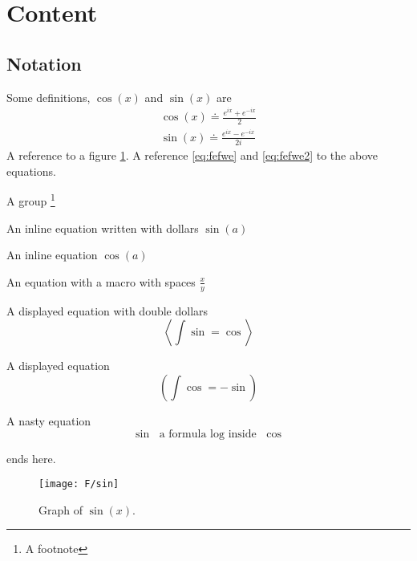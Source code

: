 \section{Content}

\subsection{Notation}

\begin{Defn}
  \label{defn:1}
  Some definitions, $\cos(x)$ and \(\sin(x)\) are
  \begin{eqnarray}
    \cos(x) \doteq \frac{e^{ix}+e^{-ix}}{2}  \label{eq:fefwe} \\
    \sin(x) \doteq \frac{e^{ix}-e^{-ix}}{2i} \label{eq:fefwe2}
  \end{eqnarray}
  A reference to a figure \ref{fig:a354}.
  A reference \eqref{eq:fefwe} and  \eqref{eq:fefwe2} to the above equations.
\end{Defn}


A group
\footnote{A footnote}
\bgroup\em

An inline equation written with dollars $\sin(a)$

An inline equation  \(\cos(a)\)

An equation with a macro with spaces
\(\frac x y\)

A displayed equation with double dollars
$$ \left<\int\sin = \cos \right>$$

A displayed equation
\[ \left(\int\cos = -\sin\right)\]

A nasty equation
$$ \sin \text{ a formula $\log$ inside } \cos $$

\egroup
ends here.

\begin{figure}[ht]\label{fig:a354}
  \begin{center}
    \texttt{[image: F/sin]}
    \caption{Graph of \(\sin(x)\).}
  \end{center}
\end{figure}


\lipsum[2]


